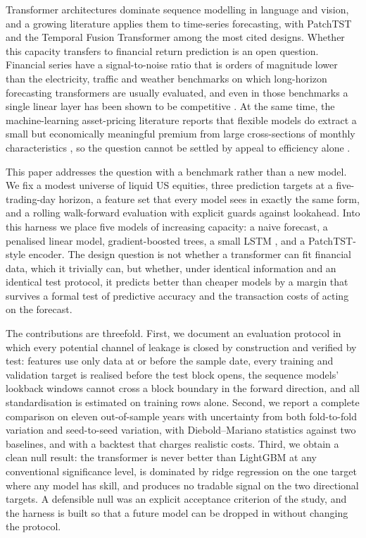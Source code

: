 \documentclass[10pt,a4paper,twoside,twocolumn]{article}
\begin{document}
Transformer architectures \citep{vaswani2017attention} dominate sequence modelling in language and vision, and a growing literature applies them to time-series forecasting, with PatchTST \citep{nie2023patchtst} and the Temporal Fusion Transformer \citep{lim2021tft} among the most cited designs. Whether this capacity transfers to financial return prediction is an open question. Financial series have a signal-to-noise ratio that is orders of magnitude lower than the electricity, traffic and weather benchmarks on which long-horizon forecasting transformers are usually evaluated, and even in those benchmarks a single linear layer has been shown to be competitive \citep{zeng2023transformers}. At the same time, the machine-learning asset-pricing literature reports that flexible models do extract a small but economically meaningful premium from large cross-sections of monthly characteristics \citep{gu2020empirical}, so the question cannot be settled by appeal to efficiency alone \citep{fama1970efficient}.

This paper addresses the question with a benchmark rather than a new model. We fix a modest universe of liquid US equities, three prediction targets at a five-trading-day horizon, a feature set that every model sees in exactly the same form, and a rolling walk-forward evaluation with explicit guards against lookahead. Into this harness we place five models of increasing capacity: a naive forecast, a penalised linear model, gradient-boosted trees, a small LSTM \citep{hochreiter1997lstm}, and a PatchTST-style encoder. The design question is not whether a transformer can fit financial data, which it trivially can, but whether, under identical information and an identical test protocol, it predicts better than cheaper models by a margin that survives a formal test of predictive accuracy \citep{diebold1995comparing} and the transaction costs of acting on the forecast.

The contributions are threefold. First, we document an evaluation protocol in which every potential channel of leakage is closed by construction and verified by test: features use only data at or before the sample date, every training and validation target is realised before the test block opens, the sequence models' lookback windows cannot cross a block boundary in the forward direction, and all standardisation is estimated on training rows alone. Second, we report a complete comparison on eleven out-of-sample years with uncertainty from both fold-to-fold variation and seed-to-seed variation, with Diebold--Mariano statistics against two baselines, and with a backtest that charges realistic costs. Third, we obtain a clean null result: the transformer is never better than LightGBM at any conventional significance level, is dominated by ridge regression on the one target where any model has skill, and produces no tradable signal on the two directional targets. A defensible null was an explicit acceptance criterion of the study, and the harness is built so that a future model can be dropped in without changing the protocol.
\end{document}
